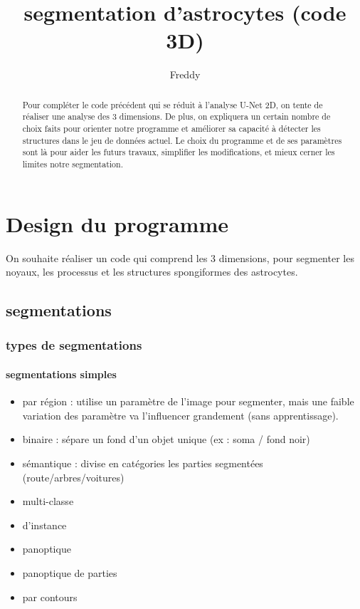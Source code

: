 \documentclass[7pt]{scrartcl}
\title{segmentation d'astrocytes (code 3D)}
\author{Freddy}
\begin{document}
\maketitle

\begin{abstract}
Pour compléter le code précédent qui se réduit à l'analyse U-Net 2D, on tente de réaliser une analyse des 3 dimensions. 
De plus, on expliquera un certain nombre de choix faits pour orienter notre programme et améliorer sa capacité à détecter les structures dans le jeu de données actuel. 
Le choix du programme et de ses paramètres sont là pour aider les futurs travaux, simplifier les modifications, et mieux cerner les limites notre segmentation.

\end{abstract}

\section{Design du programme}

On souhaite réaliser un code qui comprend les 3 dimensions, pour segmenter les noyaux, les processus et les structures spongiformes des astrocytes.

\subsection{segmentations} 
\subsubsection{types de segmentations} 
\paragraph{segmentations simples}
\begin{itemize}
    \item  par région : utilise un paramètre de l'image pour segmenter, mais une faible variation des paramètre va l'influencer grandement (sans apprentissage).
    \item binaire : sépare un fond d'un objet unique (ex : soma / fond noir) 
    \item sémantique : divise en catégories les parties segmentées (route/arbres/voitures)
    \item multi-classe 
    \item d'instance
    \item panoptique
    \item panoptique de parties
    \item par contours
\end{itemize}
\end{document}
